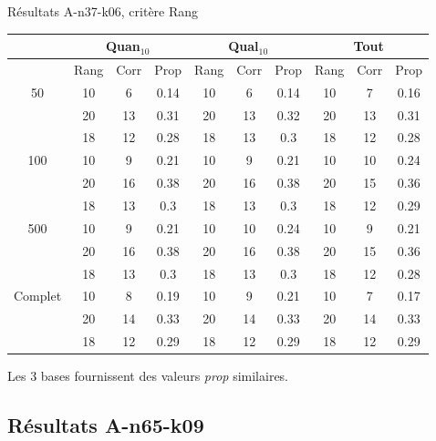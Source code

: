 \documentclass{beamer}
\begin{document}
\begin{frame}{Résultats A-n37-k06, critère Rang}
\begin{table}[H]

\begin{tabular}{|@{}c@{}|@{}c@{}|@{}c@{}|@{}c@{}||@{}c@{}|@{}c@{}|@{}c@{}||@{}c@{}|@{}c@{}|@{}c@{}|}

\hline
 & \multicolumn{3}{c|}{Quan$_{10}$} & \multicolumn{3}{c|}{Qual$_{10}$} & \multicolumn{3}{c|}{Tout} \\
 \hline
 & Rang & Corr & Prop & Rang & Corr & Prop & Rang & Corr & Prop \\
 \hline
 50 & 10  & 6 & 0.14 & 10  & 6 & 0.14 & 10  & 7 & 0.16  \\
 \cline{2-10} 
    & 20 & 13 & 0.31 & 20  & 13 & 0.32 & 20  & 13 & 0.31  \\
 \cline{2-10} 
    & 18 & 12 & 0.28 & 18 & 13 & 0.3 & 18 & 12 & 0.28  \\
  \hline
   100 & 10  & 9 & 0.21 & 10  & 9 & 0.21 & 10  & 10 & 0.24  \\
 \cline{2-10} 
    & 20 & 16 & 0.38 & 20 & 16 & 0.38 & 20 & 15 & 0.36  \\
  \cline{2-10} 
    & 18 & 13 & 0.3 & 18 & 13 & 0.3 & 18 & 12 & 0.29  \\
  \hline
   500 & 10  & 9 & 0.21 & 10  & 10 & 0.24 & 10  & 9 & 0.21  \\
 \cline{2-10} 
    & 20 & 16 & 0.38 & 20 & 16 & 0.38 & 20 & 15 & 0.36  \\
  \cline{2-10} 
    & 18 & 13 & 0.3 & 18 & 13 & 0.3 & 18 & 12 & 0.28  \\
  \hline
   Complet & 10 & 8 & 0.19 & 10 & 9 & 0.21 & 10 & 7 & 0.17  \\
 \cline{2-10} 
    & 20 & 14 & 0.33 & 20 & 14 & 0.33 & 20 & 14 & 0.33  \\
  \cline{2-10} 
    & 18 & 12 & 0.29 & 18 & 12 & 0.29 & 18 & 12 & 0.29  \\
  \hline

\end{tabular}
\end{table}

Les 3 bases fournissent des valeurs \emph{prop} similaires.
\end{frame}
\subsection{Résultats A-n65-k09}
\end{document}
